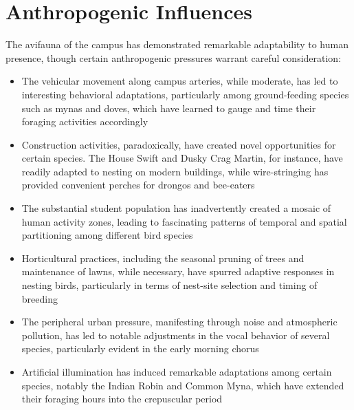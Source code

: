 \documentclass[a4paper,12pt,landscape]{memoir}
\begin{document}
{  \section*{Anthropogenic Influences}
  The avifauna of the campus has demonstrated remarkable adaptability to human presence, though certain anthropogenic pressures warrant careful consideration:

  \begin{itemize}
  \item The vehicular movement along campus arteries, while moderate, has led to interesting behavioral adaptations, particularly among ground-feeding species such as mynas and doves, which have learned to gauge and time their foraging activities accordingly
  
  \item Construction activities, paradoxically, have created novel opportunities for certain species. The House Swift and Dusky Crag Martin, for instance, have readily adapted to nesting on modern buildings, while wire-stringing has provided convenient perches for drongos and bee-eaters
  
  \item The substantial student population has inadvertently created a mosaic of human activity zones, leading to fascinating patterns of temporal and spatial partitioning among different bird species
  
  \item Horticultural practices, including the seasonal pruning of trees and maintenance of lawns, while necessary, have spurred adaptive responses in nesting birds, particularly in terms of nest-site selection and timing of breeding
  
  \item The peripheral urban pressure, manifesting through noise and atmospheric pollution, has led to notable adjustments in the vocal behavior of several species, particularly evident in the early morning chorus
  
  \item Artificial illumination has induced remarkable adaptations among certain species, notably the Indian Robin and Common Myna, which have extended their foraging hours into the crepuscular period
  \end{itemize}
}
\end{document}
